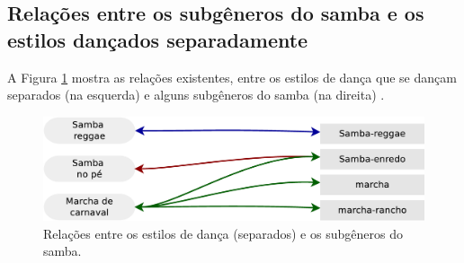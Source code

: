 \subsection{Relações entre os subgêneros do samba e os estilos dançados separadamente}

A Figura \ref{fig:sambadavavsmusicaseparado} mostra as relações existentes, 
entre os estilos de dança que se dançam separados (na esquerda) 
e alguns subgêneros do samba (na direita)  \cite[pp. 134-138]{perna2002samba}.

\begin{figure}[h]
  \centering
    \includegraphics[width=1.0\textwidth]{chapters/cap-historia-dancasamba/dancavcmusicaseparado.eps}
  \caption{Relações entre os estilos de dança (separados) e os subgêneros do samba.}
\label{fig:sambadavavsmusicaseparado}
\end{figure}
